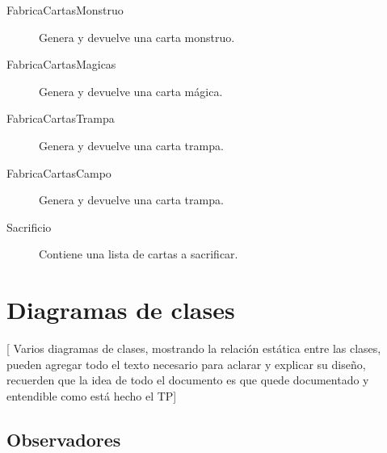 \begin{description}
\item[FabricaCartasMonstruo] Genera y devuelve una carta monstruo.

\item[FabricaCartasMagicas] Genera y devuelve una carta mágica.

\item[FabricaCartasTrampa] Genera y devuelve una carta trampa.

\item[FabricaCartasCampo] Genera y devuelve una carta trampa.

\item[Sacrificio] Contiene una lista de cartas a sacrificar.

\end{description}


\clearpage
\section{Diagramas de clases}

[ Varios diagramas de clases, mostrando la relación estática entre las
clases, pueden agregar todo el texto necesario para aclarar y explicar su
diseño, recuerden que la idea de todo el documento es que quede
documentado y entendible como está hecho el TP]

\subsection{Observadores}

